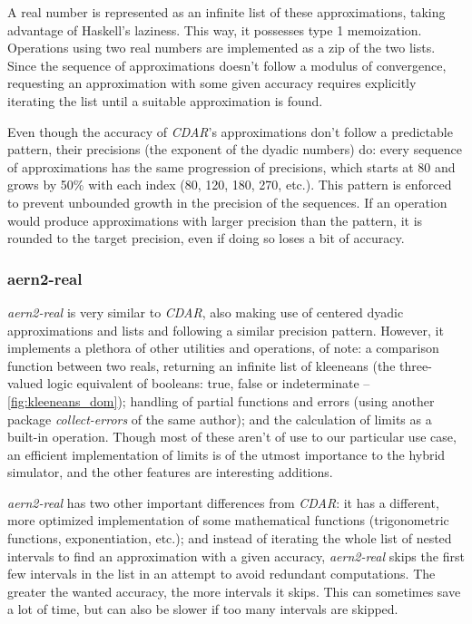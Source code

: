A real number is represented as an infinite list of these approximations, taking advantage of Haskell's laziness. This way, it possesses type 1 memoization. Operations using two real numbers are implemented as a zip of the two lists. Since the sequence of approximations doesn't follow a modulus of convergence, requesting an approximation with some given accuracy requires explicitly iterating the list until a suitable approximation is found.

Even though the accuracy of \textit{CDAR}'s approximations don't follow a predictable pattern, their precisions (the exponent of the dyadic numbers) do: every sequence of approximations has the same progression of precisions, which starts at 80 and grows by 50\% with each index (80, 120, 180, 270, etc.). This pattern is enforced to prevent unbounded growth in the precision of the sequences. If an operation would produce approximations with larger precision than the pattern, it is rounded to the target precision, even if doing so loses a bit of accuracy.

\subsubsection{aern2-real}

\textit{aern2-real} \cite{Aern2} is very similar to \textit{CDAR}, also making use of centered dyadic approximations and lists and following a similar precision pattern. However, it implements a plethora of other utilities and operations, of note: a comparison function between two reals, returning an infinite list of kleeneans (the three-valued logic equivalent of booleans: true, false or indeterminate -- \cref{fig:kleeneans_dom}); handling of partial functions and errors (using another package \textit{collect-errors} \cite{ColErr} of the same author); and the calculation of limits as a built-in operation. Though most of these aren't of use to our particular use case, an efficient implementation of limits is of the utmost importance to the hybrid simulator, and the other features are interesting additions.

\textit{aern2-real} has two other important differences from \textit{CDAR}: it has a different, more optimized implementation of some mathematical functions (trigonometric functions, exponentiation, etc.); and instead of iterating the whole list of nested intervals to find an approximation with a given accuracy, \textit{aern2-real} skips the first few intervals in the list in an attempt to avoid redundant computations. The greater the wanted accuracy, the more intervals it skips. This can sometimes save a lot of time, but can also be slower if too many intervals are skipped.

